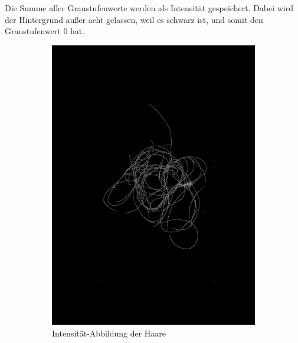 \documentclass[german,a4paper, 12pt]{scrartcl}
\begin{document}
Die Summe aller Graustufenwerte werden als Intensität gespeichert. Dabei wird der Hintergrund außer acht gelassen, weil es schwarz ist, und somit den Graustufenwert 0 hat.
\begin{figure}
	\centering
	\begin{subfigure}[b]{0.475\textwidth}
		\centering
		\includegraphics[width=\textwidth]{fig64/05intenstiy.png}
		\caption[]{Intensität-Abbildung der Haare}
		\label{img:Intensity}
	\end{subfigure}
	\hfill
	\begin{subfigure}[b]{0.475\textwidth} 
		\centering

\end{subfigure}
\end{figure}
\end{document}
